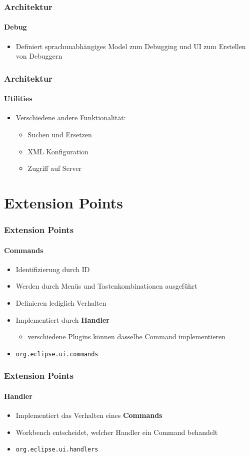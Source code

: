 {\begin{frame}
  \frametitle{Architektur}
  \framesubtitle{Debug}
  \begin{itemize}
    \item Definiert sprachunabhängiges Model zum Debugging und UI zum Erstellen von Debuggern
  \end{itemize}
\end{frame}

\begin{frame}
  \frametitle{Architektur}
  \framesubtitle{Utilities}
  \begin{itemize}
    \item Verschiedene andere Funktionalität:
    \begin{itemize}
      \item Suchen und Ersetzen
      \item XML Konfiguration
      \item Zugriff auf Server
    \end{itemize}
  \end{itemize}
\end{frame}

\section{Extension Points}
\begin{frame}
  \frametitle{Extension Points}
  \framesubtitle{Commands}
  \begin{itemize}
    \item Identifizierung durch ID
    \item Werden durch Menüs und Tastenkombinationen ausgeführt
    \item Definieren lediglich Verhalten
    \item Implementiert durch \textbf{Handler}
    \begin{itemize}
      \item verschiedene Plugins können dasselbe Command implementieren
    \end{itemize}
    \item \texttt{org.eclipse.ui.commands}
  \end{itemize}
\end{frame}

\begin{frame}
  \frametitle{Extension Points}
  \framesubtitle{Handler}
  \begin{itemize}
    \item Implementiert das Verhalten eines \textbf{Commands}
    \item Workbench entscheidet, welcher Handler ein Command behandelt
    \item \texttt{org.eclipse.ui.handlers}
  \end{itemize}
\end{frame}

}
